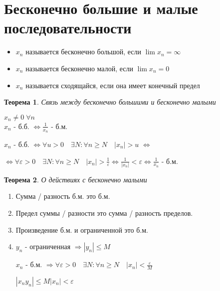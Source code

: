 \documentclass[12pt,letterpaper]{report}
\makeatletter
\newtheorem*{theorem-non}{Теорема}
\theoremstyle{definition}
\renewenvironment{proof}[1][\proofname]{%
   \par\pushQED{\qed}\normalfont%
   \topsep6\p@\@plus6\p@\relax
   \trivlist\item[\hskip\labelsep\bfseries#1\@addpunct{.}]%
   \ignorespaces
}{%
   \popQED\endtrivlist\@endpefalse
}
\makeatother
\begin{document}
    \section{Бесконечно большие и малые последовательности}
    \begin{itemize}
        \item $x_n$ называется бесконечно большой, если $\lim x_n = \infty$
        \item $x_n$ называется бесконечно малой, если $\lim x_n = 0$
        \item $x_n$ называется сходящайся, если она имеет конечный предел
    \end{itemize}
    \vspace{0.7cm}
    \begin{theorem-non} Связь между бесконечно большими и бесконечно малыми\end{theorem-non}
    $x_n \neq 0\; \forall n$ \\
    $x_n$ - б.б. $\Leftrightarrow \frac{1}{x_n}$ - б.м.
    \begin{proof}
        $x_n$ - б.б. $\Leftrightarrow \forall u > 0\quad \exists N : \forall n \geqslant N\quad |x_n| > u$ $\Leftrightarrow$ 
        
        $\Leftrightarrow \forall \varepsilon > 0\quad \exists N : \forall n \geqslant N\quad |x_n| > \frac{1}{\varepsilon} \Leftrightarrow \frac{1}{|x_n|} < \varepsilon \Leftrightarrow \frac{1}{x_n}$ - б.м.
    \end{proof}
    \begin{theorem-non} О действиях с бесконечно малыми \end{theorem-non}
    \begin{enumerate}
        \item Сумма / разность б.м. это б.м.
        \begin{proof}
            Предел суммы / разности это сумма / разность пределов. 
        \end{proof}
        \item Произведение б.м. и ограниченной это б.м.
        \begin{proof}
            $y_n$ - ограниченная $\Rightarrow |y_n| \leqslant M$ 
            
            $x_n$ - б.м. $\Rightarrow \forall \varepsilon > 0\quad \exists N : \forall n \geqslant N\quad |x_n| < \frac{\varepsilon}{M}$
            
            $|x_ny_n| \leqslant M|x_n| < \varepsilon$
        \end{proof}
    \end{enumerate}
    
\end{document}
